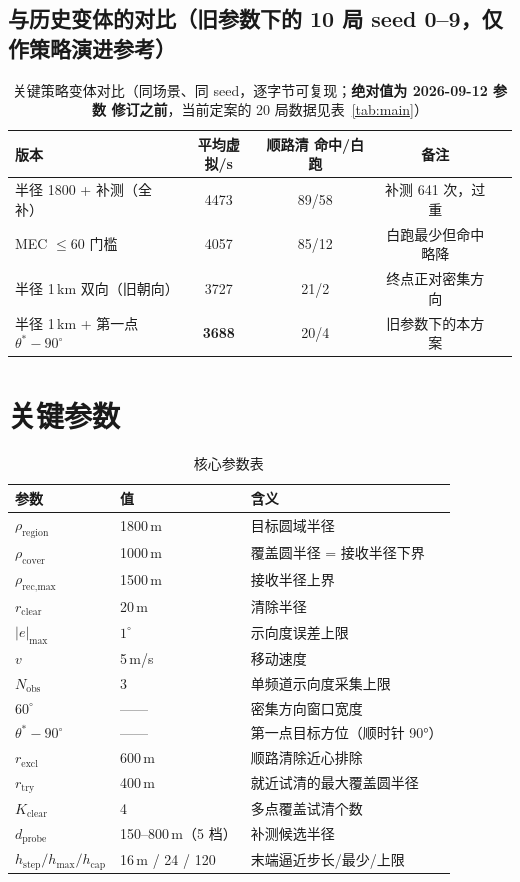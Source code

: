 \documentclass[a4paper,11pt]{ctexart}
\begin{document}
\subsection{与历史变体的对比（旧参数下的 10 局 seed 0--9，仅作策略演进参考）}
\begin{table}[H]
  \centering
  \caption{关键策略变体对比（同场景、同 seed，逐字节可复现；\textbf{绝对值为 2026-09-12 参数
  修订之前}，当前定案的 20 局数据见表~\ref{tab:main}）}
  \label{tab:variants}
  \begin{tabular}{lcccc}
    \toprule
    版本 & 平均虚拟/s & 顺路清 命中/白跑 & 备注 \\
    \midrule
    半径 1800 + 补测（全补） & 4473 & 89/58 & 补测 641 次，过重 \\
    MEC $\le 60$ 门槛 & 4057 & 85/12 & 白跑最少但命中略降 \\
    半径 1\,km 双向（旧朝向） & 3727 & 21/2 & 终点正对密集方向 \\
    半径 1\,km + 第一点 $\theta^*-90^\circ$ & \textbf{3688} & 20/4 & 旧参数下的本方案 \\
    \bottomrule
  \end{tabular}
\end{table}

\section{关键参数}
\begin{table}[H]
  \centering
  \caption{核心参数表}
  \label{tab:params}
  \begin{tabular}{lll}
    \toprule
    参数 & 值 & 含义 \\
    \midrule
    $\rho_{\text{region}}$ & 1800\,m & 目标圆域半径 \\
    $\rho_{\text{cover}}$ & 1000\,m & 覆盖圆半径 = 接收半径下界 \\
    $\rho_{\text{rec,max}}$ & 1500\,m & 接收半径上界 \\
    $r_{\text{clear}}$ & 20\,m & 清除半径 \\
    $|e|_{\max}$ & $1^\circ$ & 示向度误差上限 \\
    $v$ & 5\,m/s & 移动速度 \\
    $N_{\text{obs}}$ & $3$ & 单频道示向度采集上限 \\
    $60^\circ$ & —— & 密集方向窗口宽度 \\
    $\theta^* - 90^\circ$ & —— & 第一点目标方位（顺时针 90°） \\
    $r_{\text{excl}}$ & 600\,m & 顺路清除近心排除 \\
    $r_{\text{try}}$ & 400\,m & 就近试清的最大覆盖圆半径 \\
    $K_{\text{clear}}$ & 4 & 多点覆盖试清个数 \\
    $d_{\text{probe}}$ & 150--800\,m（5 档） & 补测候选半径 \\
    $h_{\text{step}}/h_{\max}/h_{\text{cap}}$ & 16\,m / 24 / 120 & 末端逼近步长/最少/上限 \\
    \bottomrule
  \end{tabular}
\end{table}
\end{document}
